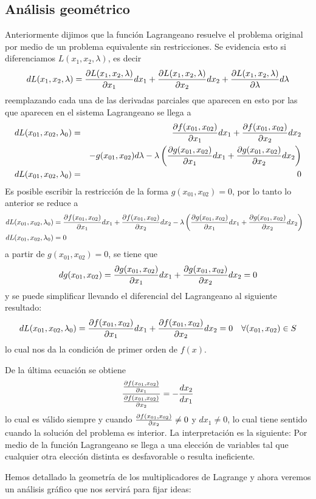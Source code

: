 \subsection{An\'alisis geom\'etrico}

Anteriormente dijimos que la funci\'on Lagrangeano resuelve el problema original por medio de un problema equivalente sin restricciones. Se evidencia esto si diferenciamos $L(x_1,x_2,\lambda)$, es decir
$$dL(x_1,x_2,\lambda) = \frac{\partial L(x_1,x_2,\lambda)}{\partial x_1}dx_1 + \frac{\partial L(x_1,x_2,\lambda)}{\partial x_2}dx_2 + \frac{\partial L(x_1,x_2,\lambda)}{\partial \lambda}d\lambda$$
reemplazando cada una de las derivadas parciales que aparecen en esto por las que aparecen en el sistema Lagrangeano se llega a
\begin{eqnarray*}
dL(x_{01},x_{02},\lambda_0) &=& \frac{\partial f(x_{01},x_{02})}{\partial x_1}dx_1 + \frac{\partial f(x_{01},x_{02})}{\partial x_2}dx_2 \cr
& & - g(x_{01},x_{02})d\lambda - \lambda \left(\frac{\partial g(x_{01},x_{02})}{\partial x_1}dx_1 + \frac{\partial g(x_{01},x_{02})}{\partial x_2}dx_2 \right) \cr
dL(x_{01},x_{02},\lambda_0) &=& 0						  	 
\end{eqnarray*}
Es posible escribir la restricci\'on de la forma $g(x_{01},x_{02})=0$, por lo tanto lo anterior se reduce a
\begin{align*}
dL(x_{01},x_{02},\lambda_0) &= \frac{\partial f(x_{01},x_{02})}{\partial x_1}dx_1 + \frac{\partial f(x_{01},x_{02})}{\partial x_2}dx_2 - \lambda \left(\frac{\partial g(x_{01},x_{02})}{\partial x_1}dx_1 + \frac{\partial g(x_{01},x_{02})}{\partial x_2}dx_2 \right) \cr 
dL(x_{01},x_{02},\lambda_0) &= 0
\end{align*}
a partir de $g(x_{01},x_{02})=0$, se tiene que 
$$dg(x_{01},x_{02})=\frac{\partial g(x_{01},x_{02})}{\partial x_1}dx_1 + \frac{\partial g(x_{01},x_{02})}{\partial x_2}dx_2 = 0$$ 
y se puede simplificar llevando el diferencial del Lagrangeano al siguiente resultado:
$$dL(x_{01},x_{02},\lambda_0) = \frac{\partial f(x_{01},x_{02})}{\partial x_1}dx_1 + \frac{\partial f(x_{01},x_{02})}{\partial x_2}dx_2 = 0 \quad \forall (x_{01},x_{02})\in S$$
lo cual nos da la condici\'on de primer orden de $f(x)$. 

De la \'ultima ecuaci\'on se obtiene
$$\frac{\frac{\partial f(x_{01},x_{02})}{\partial x_1}}{\frac{\partial f(x_{01},x_{02})}{\partial x_2}} = -\frac{dx_2}{dx_1}$$
lo cual es v\'alido siempre y cuando $\frac{\partial f(x_{01},x_{02})}{\partial x_2} \neq 0$ y $dx_1 \neq 0$, lo cual tiene sentido cuando la soluci\'on del problema es interior. La interpretaci\'on es la siguiente: Por medio de la funci\'on Lagrangeano se llega a una elecci\'on de variables tal que cualquier otra elecci\'on distinta es desfavorable o resulta ineficiente.

Hemos detallado la geometr\'ia de los multiplicadores de Lagrange y ahora veremos un an\'alisis gr\'afico que nos servir\'a para fijar ideas:

